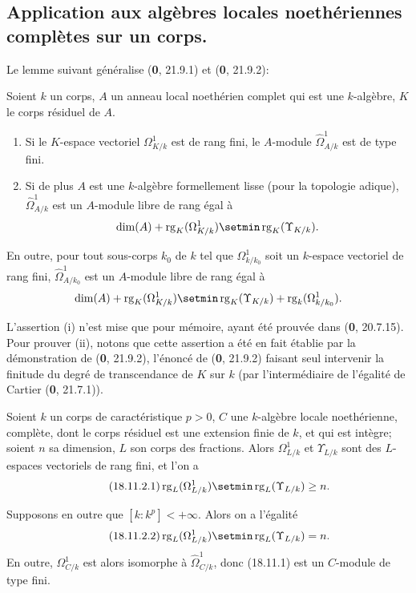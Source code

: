\subsection{Application aux algèbres locales noethériennes complètes sur un corps.}

Le lemme suivant généralise (\textbf{0}, 21.9.1) et (\textbf{0}, 21.9.2):

\begin{lemma}[18.11.1]
\label{IV.18.11.1}
Soient $k$ un corps, $A$ un anneau local noethérien complet qui est une $k$-algèbre, $K$ le corps résiduel de $A$.
\begin{enumerate}
  \item[\textup{(i)}] Si le $K$-espace vectoriel $\Omega^1_{K/k}$ est de rang fini, le $A$-module $\hat{\Omega}^1_{A/k}$ est de type fini.
  \item[\textup{(ii)}] Si de plus $A$ est une $k$-algèbre formellement lisse (pour la topologie adique), $\hat{\Omega}^1_{A/k}$ est un $A$-module libre de rang égal à
\[
    \dim(A)+\operatorname{rg}_K(\Omega^1_{K/k})\setmin\operatorname{rg}_K(\Upsilon_{K/k}).
\]
\end{enumerate}

En outre, pour tout sous-corps $k_0$ de $k$ tel que $\Omega^1_{k/k_0}$ soit un $k$-espace vectoriel de rang fini, $\hat{\Omega}^1_{A/k_0}$ est un $A$-module libre de rang égal à
\[
  \dim(A)+\operatorname{rg}_K(\Omega^1_{K/k})\setmin\operatorname{rg}_K(\Upsilon_{K/k})+\operatorname{rg}_k(\Omega^1_{k/k_0}).
\]
\end{lemma}

L'assertion (i) n'est mise que pour mémoire, ayant été prouvée dans (\textbf{0}, 20.7.15). Pour prouver (ii), notons que cette assertion a été en fait établie par la démonstration de (\textbf{0}, 21.9.2), l'énoncé de (\textbf{0}, 21.9.2) faisant seul intervenir la finitude du degré de transcendance de $K$ sur $k$ (par l'intermédiaire de l'égalité de Cartier (\textbf{0}, 21.7.1)).

\begin{lemma}[18.11.2]
\label{IV.18.11.2}
Soient $k$ un corps de caractéristique $p>0$, $C$ une $k$-algèbre locale noethérienne, complète, dont le corps résiduel est une extension finie de $k$, et qui est intègre; soient $n$ sa dimension, $L$ son corps des fractions. Alors $\Omega^1_{L/k}$ et $\Upsilon_{L/k}$ sont des $L$-espaces vectoriels de rang fini, et l'on a
\begin{equation}
\label{IV.18.11.2.1}
\tag{18.11.2.1}
  \operatorname{rg}_L(\Omega^1_{L/k})\setmin\operatorname{rg}_L(\Upsilon_{L/k})\geq n.
\end{equation}


Supposons en outre que $[k:k^p]<+\infty$. Alors on a l'égalité
\begin{equation}
\label{IV.18.11.2.2}
\tag{18.11.2.2}
  \operatorname{rg}_L(\Omega^1_{L/k})\setmin\operatorname{rg}_L(\Upsilon_{L/k})=n.
\end{equation}
En outre, $\Omega^1_{C/k}$ est alors isomorphe à $\hat{\Omega}^1_{C/k}$, donc \textup{(18.11.1)} est un $C$-module de type fini.
\end{lemma}

